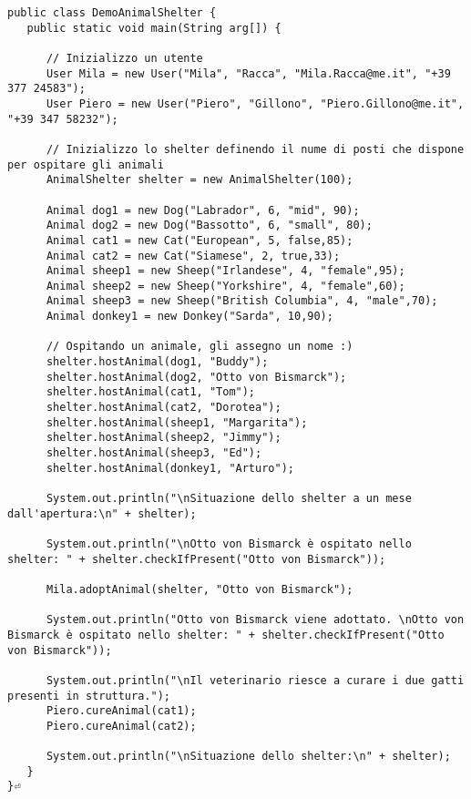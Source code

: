 \documentclass{article}
\begin{document}
\begin{lstlisting}[caption={DemoAnimalShelter.java}]
public class DemoAnimalShelter {
   public static void main(String arg[]) {

      // Inizializzo un utente
      User Mila = new User("Mila", "Racca", "Mila.Racca@me.it", "+39 377 24583");
      User Piero = new User("Piero", "Gillono", "Piero.Gillono@me.it", "+39 347 58232");

      // Inizializzo lo shelter definendo il nume di posti che dispone per ospitare gli animali
      AnimalShelter shelter = new AnimalShelter(100);

      Animal dog1 = new Dog("Labrador", 6, "mid", 90);
      Animal dog2 = new Dog("Bassotto", 6, "small", 80);
      Animal cat1 = new Cat("European", 5, false,85);
      Animal cat2 = new Cat("Siamese", 2, true,33);
      Animal sheep1 = new Sheep("Irlandese", 4, "female",95);
      Animal sheep2 = new Sheep("Yorkshire", 4, "female",60);
      Animal sheep3 = new Sheep("British Columbia", 4, "male",70);
      Animal donkey1 = new Donkey("Sarda", 10,90);

      // Ospitando un animale, gli assegno un nome :)
      shelter.hostAnimal(dog1, "Buddy");
      shelter.hostAnimal(dog2, "Otto von Bismarck");
      shelter.hostAnimal(cat1, "Tom");
      shelter.hostAnimal(cat2, "Dorotea");
      shelter.hostAnimal(sheep1, "Margarita");
      shelter.hostAnimal(sheep2, "Jimmy");
      shelter.hostAnimal(sheep3, "Ed");
      shelter.hostAnimal(donkey1, "Arturo");

      System.out.println("\nSituazione dello shelter a un mese dall'apertura:\n" + shelter);

      System.out.println("\nOtto von Bismarck è ospitato nello shelter: " + shelter.checkIfPresent("Otto von Bismarck"));

      Mila.adoptAnimal(shelter, "Otto von Bismarck");

      System.out.println("Otto von Bismarck viene adottato. \nOtto von Bismarck è ospitato nello shelter: " + shelter.checkIfPresent("Otto von Bismarck"));

      System.out.println("\nIl veterinario riesce a curare i due gatti presenti in struttura.");
      Piero.cureAnimal(cat1);
      Piero.cureAnimal(cat2);

      System.out.println("\nSituazione dello shelter:\n" + shelter);
   }
}⏎   
\end{lstlisting}
	
	
\end{document}

